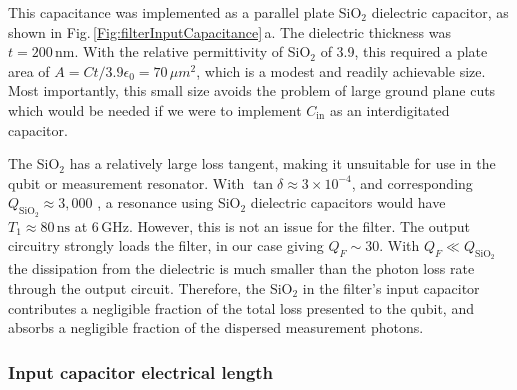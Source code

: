 This capacitance was implemented as a parallel plate SiO$_2$ dielectric capacitor, as shown in Fig.\,\ref{Fig:filterInputCapacitance}\,a.
The dielectric thickness was $t = 200\,\text{nm}$.
With the relative permittivity of SiO$_2$ of 3.9, this required a plate area of $A = C t / 3.9 \epsilon_0 = 70 \, \mu m ^2$, which is a modest and readily achievable size.
Most importantly, this small size avoids the problem of large ground plane cuts which would be needed if we were to implement $C_{\text{in}}$ as an interdigitated capacitor.

The SiO$_2$ has a relatively large loss tangent, making it unsuitable for use in the qubit or measurement resonator.
With $\tan\delta \approx 3\times 10^{-4}$, and corresponding $Q_{\text{SiO}_2} \approx 3,000$ \cite{OConnell:microwaveLoss2008}, a resonance using SiO$_2$ dielectric capacitors would have $T_1 \approx 80\,\text{ns}$ at 6\,GHz.
However, this is not an issue for the filter.
The output circuitry strongly loads the filter, in our case giving $Q_F \sim 30$.
With $Q_F \ll Q_{\text{SiO}_2}$ the dissipation from the dielectric is much smaller than the photon loss rate through the output circuit.
Therefore, the SiO$_2$ in the filter's input capacitor contributes a negligible fraction of the total loss presented to the qubit, and absorbs a negligible fraction of the dispersed measurement photons.

\subsubsection{Input capacitor electrical length}

